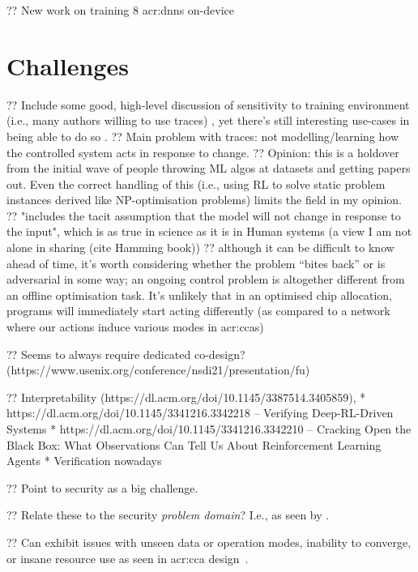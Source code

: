 ?? New work on training \qty{8}{\bit} \glspl{acr:dnn} on-device~\parencite{DBLP:conf/usenix/Zhou0QGXZGLZ21}

\section{Challenges}\label{sec:ddn-challenges}

?? Include some good, high-level discussion of sensitivity to training environment (i.e., many authors willing to use traces) \textcite{DBLP:conf/hotnets/BartulovicJBSS17}, yet there's still interesting use-cases in being able to do so \textcite{DBLP:conf/hotnets/LecuyerLNSSS17}.
?? Main problem with traces: not modelling/learning how the controlled system acts in response to change.
?? Opinion: this is a holdover from the initial wave of people throwing ML algos at datasets and getting papers out. Even the correct handling of this (i.e., using RL to solve static problem instances derived like NP-optimisation problems) limits the field in my opinion.
?? "includes the tacit assumption that the model will not change in response to the input", which is as true in science as it is in Human systems (a view I am not alone in sharing (cite Hamming book))
?? although it can be difficult to know ahead of time, it's worth considering whether the problem ``bites back'' or is adversarial in some way; an ongoing control problem is altogether different from an offline optimisation task. It's unlikely that in an optimised chip allocation, programs will immediately start acting differently (as compared to a network where our actions induce various modes in \glspl{acr:cca})

?? Seems to always require dedicated co-design? (https://www.usenix.org/conference/nsdi21/presentation/fu)

?? Interpretability (https://dl.acm.org/doi/10.1145/3387514.3405859),
* https://dl.acm.org/doi/10.1145/3341216.3342218 -- Verifying Deep-RL-Driven Systems
* https://dl.acm.org/doi/10.1145/3341216.3342210 -- Cracking Open the Black Box: What Observations Can Tell Us About Reinforcement Learning Agents
* Verification nowadays~\parencite{DBLP:conf/sigcomm/EliyahuKKS21,drl-verification-2}

?? Point to security as a big challenge.

?? Relate these to the security \emph{problem domain}? I.e., as seen by \citeauthor{DBLP:conf/sp/SommerP10}.

?? Can exhibit issues with unseen data or operation modes, inability to converge, or insane resource use as seen in \gls{acr:cca} design~\parencite{DBLP:conf/sigcomm/AbbaslooYC20}.

